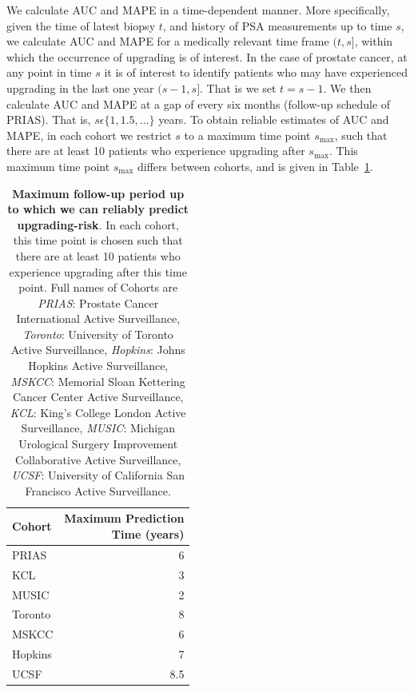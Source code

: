 We calculate AUC and MAPE in a time-dependent manner. More specifically, given the time of latest biopsy $t$, and history of PSA measurements up to time $s$, we calculate AUC and MAPE for a medically relevant time frame $(t, s]$, within which the occurrence of upgrading is of interest. In the case of prostate cancer, at any point in time $s$ it is of interest to identify patients who may have experienced upgrading in the last one year $(s-1, s]$. That is we set $t=s-1$. We then calculate AUC and MAPE at a gap of every six months (follow-up schedule of PRIAS). That is, $s \epsilon \{1, 1.5, \ldots \}$ years. To obtain reliable estimates of AUC and MAPE, in each cohort we restrict $s$ to a maximum time point $s_{\mbox{max}}$, such that there are at least 10 patients who experience upgrading after $s_{\mbox{max}}$. This maximum time point $s_{\mbox{max}}$ differs between cohorts, and is given in Table~\ref{tab:max_pred_time}.

\begin{table}[!htb]
\small\sf\centering
\caption{\textbf{Maximum follow-up period up to which we can reliably predict upgrading-risk}. In each cohort, this time point is chosen such that there are at least 10 patients who experience upgrading after this time point. Full names of Cohorts are \textit{PRIAS}: Prostate Cancer International Active Surveillance, \textit{Toronto}: University of Toronto Active Surveillance, \textit{Hopkins}: Johns Hopkins Active Surveillance, \textit{MSKCC}: Memorial Sloan Kettering Cancer Center Active Surveillance, \textit{KCL}: King's College London Active Surveillance, \textit{MUSIC}: Michigan Urological Surgery Improvement Collaborative Active Surveillance, \textit{UCSF}: University of California San Francisco Active Surveillance.}
\label{tab:max_pred_time}
\begin{tabular}{l|r}
\hline
\hline
Cohort & \parbox[t]{3.5cm}{Maximum Prediction\\Time (years)}\\
\hline
PRIAS & 6\\
KCL & 3\\
MUSIC & 2\\
Toronto & 8\\
MSKCC & 6\\
Hopkins & 7\\
UCSF & 8.5\\
\hline
\end{tabular}	
\end{table}

